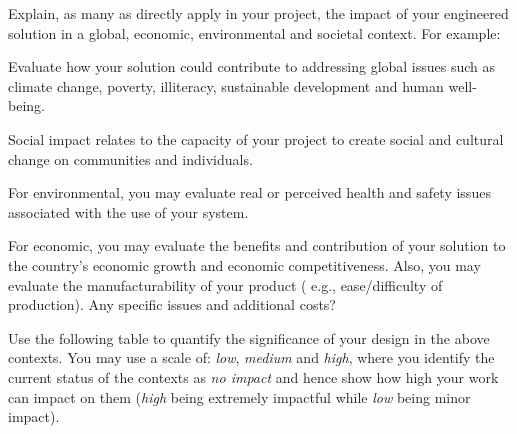 \documentclass[../main.tex]{subfiles}
\begin{document}
\begin{newrequirements}
    \begin{todolist}
    \item Explain, as many as directly apply in 
        your project, the impact of your 
        engineered solution in a global, 
        economic, environmental and societal 
        context. For example: 

    \begin{todolist}
    \item Evaluate how your solution could 
        contribute to addressing global issues 
        such as climate change, poverty, 
        illiteracy, sustainable development and 
        human well-being. 

    \item Social impact relates to the capacity 
        of your project to create social and 
        cultural change on communities and 
        individuals. 

    \item For environmental, you may evaluate 
        real or perceived health and safety 
        issues associated with the use of your 
        system. 

    \item For economic, you may evaluate the 
        benefits and contribution of your 
        solution to the country’s economic 
        growth and economic competitiveness. 
        Also, you may evaluate the 
        manufacturability of your product (
        e.g., ease/difficulty of production). 
        Any specific issues and additional 
        costs? 
    \end{todolist}

    \item Use the following table to quantify the 
        significance of your design in the 
        above contexts. You may use a scale of: 
        \textit{low}, \textit{medium} and \textit{high}, 
        where you 
        identify the current status of the 
        contexts as \textit{no impact} and hence show 
        how high your work can impact on them
        (\textit{high} being extremely impactful while 
        \textit{low} being minor impact). 

    \end{todolist}
\end{newrequirements}

\setcounter{impactcounter}{1}
\newcommand\showimpactcounter{%
    \theimpactcounter\stepcounter{impactcounter}%
}
\end{document}
